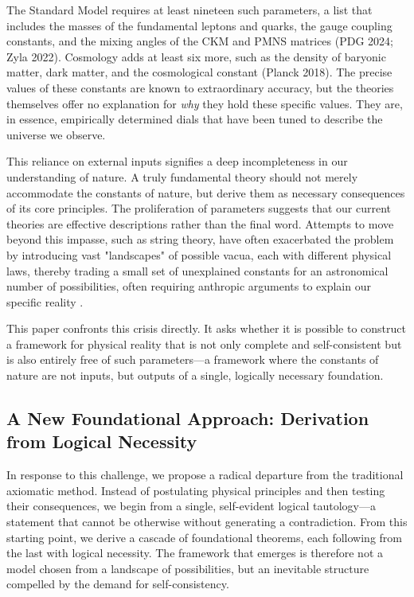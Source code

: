 The Standard Model requires at least nineteen such parameters, a list that includes the masses of the fundamental leptons and quarks, the gauge coupling constants, and the mixing angles of the CKM and PMNS matrices (PDG 2024; Zyla 2022). Cosmology adds at least six more, such as the density of baryonic matter, dark matter, and the cosmological constant (Planck 2018). The precise values of these constants are known to extraordinary accuracy, but the theories themselves offer no explanation for \textit{why} they hold these specific values. They are, in essence, empirically determined dials that have been tuned to describe the universe we observe.

This reliance on external inputs signifies a deep incompleteness in our understanding of nature. A truly fundamental theory should not merely accommodate the constants of nature, but derive them as necessary consequences of its core principles. The proliferation of parameters suggests that our current theories are effective descriptions rather than the final word. Attempts to move beyond this impasse, such as string theory, have often exacerbated the problem by introducing vast "landscapes" of possible vacua, each with different physical laws, thereby trading a small set of unexplained constants for an astronomical number of possibilities, often requiring anthropic arguments to explain our specific reality \cite{Susskind2003, Weinberg1987}.

This paper confronts this crisis directly. It asks whether it is possible to construct a framework for physical reality that is not only complete and self-consistent but is also entirely free of such parameters—a framework where the constants of nature are not inputs, but outputs of a single, logically necessary foundation.

\subsection{A New Foundational Approach: Derivation from Logical Necessity}
In response to this challenge, we propose a radical departure from the traditional axiomatic method. Instead of postulating physical principles and then testing their consequences, we begin from a single, self-evident logical tautology—a statement that cannot be otherwise without generating a contradiction. From this starting point, we derive a cascade of foundational theorems, each following from the last with logical necessity. The framework that emerges is therefore not a model chosen from a landscape of possibilities, but an inevitable structure compelled by the demand for self-consistency.

